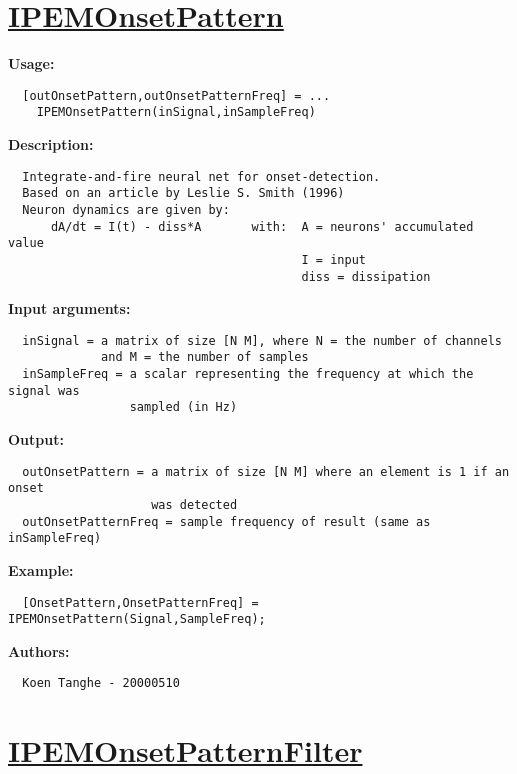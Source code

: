 \newpage
\section*{\hyperlink{Concepts:IPEMOnsetPattern}{IPEMOnsetPattern}}
\hypertarget{FuncRef:IPEMOnsetPattern}{}

\textbf{Usage:}
\begin{verbatim}  [outOnsetPattern,outOnsetPatternFreq] = ...
    IPEMOnsetPattern(inSignal,inSampleFreq)

\end{verbatim}
\textbf{Description:}
\begin{verbatim}  Integrate-and-fire neural net for onset-detection.
  Based on an article by Leslie S. Smith (1996)
  Neuron dynamics are given by:
      dA/dt = I(t) - diss*A       with:  A = neurons' accumulated value
                                         I = input
                                         diss = dissipation 
\end{verbatim}
\textbf{Input arguments:}
\begin{verbatim}  inSignal = a matrix of size [N M], where N = the number of channels
             and M = the number of samples
  inSampleFreq = a scalar representing the frequency at which the signal was
                 sampled (in Hz)

\end{verbatim}
\textbf{Output:}
\begin{verbatim}  outOnsetPattern = a matrix of size [N M] where an element is 1 if an onset
                    was detected
  outOnsetPatternFreq = sample frequency of result (same as inSampleFreq)

\end{verbatim}
\textbf{Example:}
\begin{verbatim}  [OnsetPattern,OnsetPatternFreq] = IPEMOnsetPattern(Signal,SampleFreq);

\end{verbatim}
\textbf{Authors:}
\begin{verbatim}  Koen Tanghe - 20000510
\end{verbatim}


\newpage
\section*{\hyperlink{Concepts:IPEMOnsetPatternFilter}{IPEMOnsetPatternFilter}}
\hypertarget{FuncRef:IPEMOnsetPatternFilter}{}

